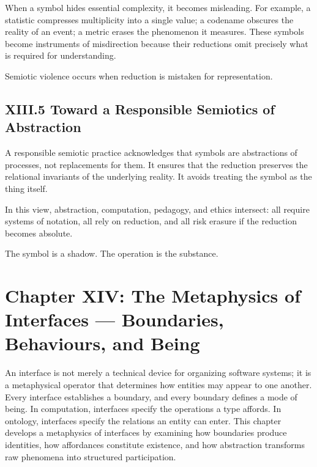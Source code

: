 \documentclass[11pt,letterpaper]{article}
\begin{document}
When a symbol hides essential complexity, it becomes misleading. For example, a statistic compresses multiplicity into a single value; a codename obscures the reality of an event; a metric erases the phenomenon it measures. These symbols become instruments of misdirection because their reductions omit precisely what is required for understanding.

Semiotic violence occurs when reduction is mistaken for representation.

\subsection{XIII.5 Toward a Responsible Semiotics of Abstraction}

A responsible semiotic practice acknowledges that symbols are abstractions of processes, not replacements for them. It ensures that the reduction preserves the relational invariants of the underlying reality. It avoids treating the symbol as the thing itself.

In this view, abstraction, computation, pedagogy, and ethics intersect: all require systems of notation, all rely on reduction, and all risk erasure if the reduction becomes absolute.

The symbol is a shadow. The operation is the substance.

\newpage
\section{Chapter XIV: The Metaphysics of Interfaces — Boundaries, Behaviours, and Being}

An interface is not merely a technical device for organizing software systems; it is a metaphysical operator that determines how entities may appear to one another. Every interface establishes a boundary, and every boundary defines a mode of being. In computation, interfaces specify the operations a type affords. In ontology, interfaces specify the relations an entity can enter. This chapter develops a metaphysics of interfaces by examining how boundaries produce identities, how affordances constitute existence, and how abstraction transforms raw phenomena into structured participation.

\end{document}
